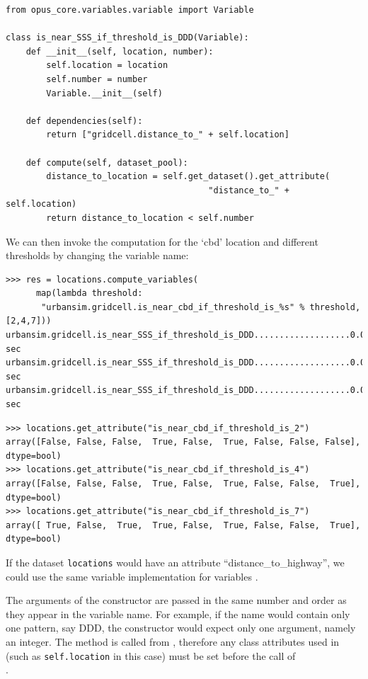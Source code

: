 \begin{verbatim}
from opus_core.variables.variable import Variable

class is_near_SSS_if_threshold_is_DDD(Variable):
    def __init__(self, location, number):
        self.location = location
        self.number = number
        Variable.__init__(self)

    def dependencies(self):
        return ["gridcell.distance_to_" + self.location]

    def compute(self, dataset_pool):
        distance_to_location = self.get_dataset().get_attribute(
                                        "distance_to_" + self.location)
        return distance_to_location < self.number
\end{verbatim}
We can then invoke the computation for the `cbd' location and different
thresholds by changing the variable name:
\begin{verbatim}
>>> res = locations.compute_variables(
      map(lambda threshold:
       "urbansim.gridcell.is_near_cbd_if_threshold_is_%s" % threshold, [2,4,7]))
urbansim.gridcell.is_near_SSS_if_threshold_is_DDD...................0.0 sec
urbansim.gridcell.is_near_SSS_if_threshold_is_DDD...................0.0 sec
urbansim.gridcell.is_near_SSS_if_threshold_is_DDD...................0.0 sec
\end{verbatim}


\begin{verbatim}
>>> locations.get_attribute("is_near_cbd_if_threshold_is_2")
array([False, False, False,  True, False,  True, False, False, False], dtype=bool)
>>> locations.get_attribute("is_near_cbd_if_threshold_is_4")
array([False, False, False,  True, False,  True, False, False,  True], dtype=bool)
>>> locations.get_attribute("is_near_cbd_if_threshold_is_7")
array([ True, False,  True,  True, False,  True, False, False,  True], dtype=bool)
\end{verbatim}

If the dataset \verb|locations| would have an attribute
``distance_to_highway'', we
could use the same variable implementation for variables
.

The arguments of the constructor are passed in the same number and order as
they appear in the variable name. For example, if the name would contain only
one pattern, say DDD, the constructor would expect only one argument, namely
an integer. The method  is called from
, therefore any class attributes used in
 (such as \verb|self.location| in this case) must be set
before the call of \\
.

